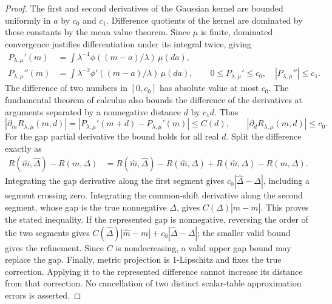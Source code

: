 \begin{proof}
The first and second derivatives of the Gaussian kernel are bounded
uniformly in $a$ by $c_0$ and $c_1$. Difference quotients of the kernel
are dominated by these constants by the mean value theorem. Since
$\mu$ is finite, dominated convergence justifies differentiation under
its integral twice, giving
\begin{align}
 P_{\lambda,\mu}'(m)&=\int\lambda^{-1}
                 \phi((m-a)/\lambda)\,\mu(da),\nonumber\\
 P_{\lambda,\mu}''(m)&=\int\lambda^{-2}
                 \phi'((m-a)/\lambda)\,\mu(da),\qquad
 0\leq P_{\lambda,\mu}'\leq c_0,\quad
 |P_{\lambda,\mu}''|\leq c_1.
 \label{eq:common-information-derivatives}
\end{align}
The difference of two numbers in $[0,c_0]$ has absolute value at most
$c_0$. The fundamental theorem of calculus also bounds the difference
of the derivatives at arguments separated by a nonnegative distance $d$
by $c_1d$. Thus
\begin{equation}
 |\partial_m R_{\lambda,\mu}(m,d)|
   =|P_{\lambda,\mu}'(m+d)-P_{\lambda,\mu}'(m)|\leq C(d),\qquad
 |\partial_dR_{\lambda,\mu}(m,d)|\leq c_0.
 \label{eq:common-information-partial-bounds}
\end{equation}
For the gap partial derivative the bound holds for all real $d$.
Split the difference exactly as
\begin{align}
 R(\widehat m,\widehat\Delta)-R(m,\Delta)
 &=R(\widehat m,\widehat\Delta)-R(\widehat m,\Delta)
       +R(\widehat m,\Delta)-R(m,\Delta).
 \label{eq:common-information-path}
\end{align}
Integrating the gap derivative along the first segment gives
$c_0|\widehat\Delta-\Delta|$, including a segment crossing zero.
Integrating the common-shift derivative along the second segment, whose
gap is the true nonnegative $\Delta$, gives
$C(\Delta)|\widehat m-m|$. This proves the stated inequality. If the
represented gap is nonnegative, reversing the order of the two segments
gives $C(\widehat\Delta)|\widehat m-m|+c_0|\widehat\Delta-\Delta|$;
the smaller valid bound gives the refinement. Since $C$ is nondecreasing,
a valid upper gap bound may replace the gap. Finally, metric projection
is $1$-Lipschitz and fixes the true correction. Applying it to the
represented difference cannot increase its distance from that correction.
No cancellation of two distinct scalar-table approximation errors is
asserted.
\end{proof}

